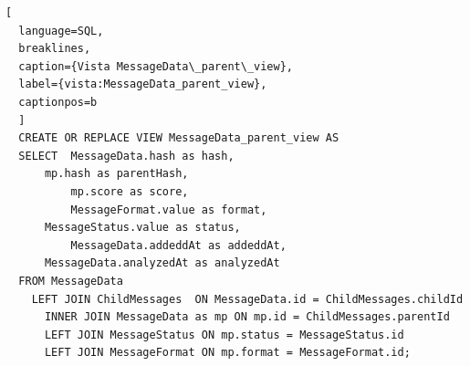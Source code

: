 \begin{lstlisting}[
  language=SQL,
  breaklines, 
  caption={Vista MessageData\_parent\_view}, 
  label={vista:MessageData_parent_view}, 
  captionpos=b
  ]
  CREATE OR REPLACE VIEW MessageData_parent_view AS 
  SELECT  MessageData.hash as hash,
      mp.hash as parentHash, 
          mp.score as score,
          MessageFormat.value as format,
      MessageStatus.value as status,
          MessageData.addeddAt as addeddAt,
      MessageData.analyzedAt as analyzedAt
  FROM MessageData 
    LEFT JOIN ChildMessages  ON MessageData.id = ChildMessages.childId
      INNER JOIN MessageData as mp ON mp.id = ChildMessages.parentId
      LEFT JOIN MessageStatus ON mp.status = MessageStatus.id
      LEFT JOIN MessageFormat ON mp.format = MessageFormat.id;
\end{lstlisting}